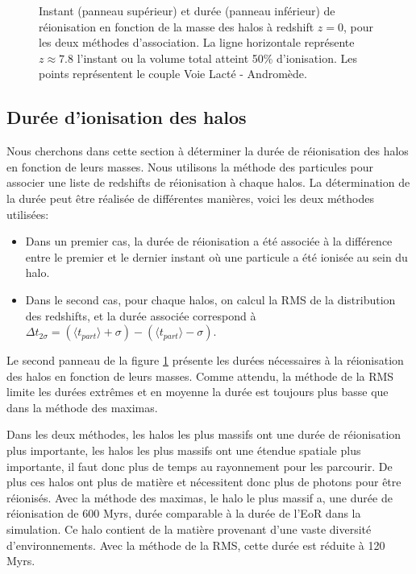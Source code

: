 \begin{figure}
        \caption[Instant et durée de réionisation]{Instant (panneau supérieur) et durée (panneau inférieur) de réionisation en fonction de la masse des halos à redshift $z=0$, pour les deux méthodes d'association. 
        La ligne horizontale représente $z\approx7.8$ l'instant ou la volume total atteint 50\% d'ionisation.
        Les points représentent le couple Voie Lacté - Andromède.
		\label{fig:CODA_t}}
\end{figure}


\subsection{Durée d'ionisation des halos}

Nous cherchons dans cette section à déterminer la durée de réionisation des halos en fonction de leurs masses.
Nous utilisons la méthode des particules pour associer une liste de redshifts de réionisation à chaque halos.
La détermination de la durée peut être réalisée de différentes manières, voici les deux méthodes utilisées:
\begin{itemize}
\item Dans un premier cas, la durée de réionisation a été associée à la différence entre le premier et le dernier instant où une particule a été ionisée au sein du halo.
\item Dans le second cas, pour chaque halos, on calcul la RMS de la distribution des redshifts, et la durée associée correspond à $\Delta t_{2\sigma} =  ( \langle t_{part} \rangle + \sigma) - ( \langle t_{part} \rangle - \sigma)$.
\end{itemize}

Le second panneau de la figure \ref{fig:CODA_t} présente les durées nécessaires à la réionisation des halos en fonction de leurs masses.
Comme attendu, la méthode de la RMS limite les durées extrêmes et en moyenne la durée est toujours plus basse que dans la méthode des maximas.

Dans les deux méthodes, les halos les plus massifs ont une durée de réionisation plus importante, les halos les plus massifs ont une étendue spatiale plus importante, il faut donc plus de temps au rayonnement pour les parcourir.
De plus ces halos ont plus de matière et nécessitent donc plus de photons pour être réionisés.
Avec la méthode des maximas, le halo le plus massif a, une durée de réionisation de 600 Myrs, durée comparable à la durée de l'\ac{EoR} dans la simulation.
Ce halo contient de la matière provenant d'une vaste diversité d’environnements. %
Avec la méthode de la RMS, cette durée est réduite à 120 Myrs.

